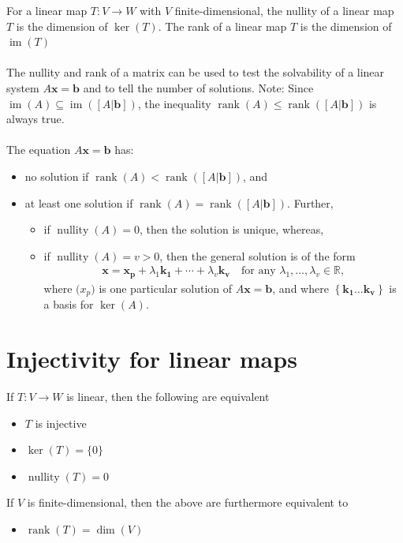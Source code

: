 \documentclass{report}
\renewcommand{\vec}{\mathbf}
\newcommand{\Dim}{\operatorname{dim}}
\newcommand{\Ker}{\operatorname{ker}}
\newcommand{\Image}{\operatorname{im}}
\newcommand{\Nullity}{\operatorname{nullity}}
\newcommand{\Rank}{\operatorname{rank}}
\begin{document}
\begin{enumerate}
	For a linear map $T: V \to W$ with $V$ finite-dimensional, the nullity of a linear map $T$ is the dimension of $\Ker(T)$. The rank of a linear map $T$ is the dimension of $\Image(T)$
	\\ \\
	The nullity and rank of a matrix can be used to test the solvability of a linear system $A\vec{x} = \vec{b}$ and to tell the number of solutions. Note: Since $\Image(A) \subseteq \Image([A|\vec{b}])$, the inequality $\Rank(A) \leq \Rank([A|\vec{b}])$ is always true.
	\\ \\
	The equation $A\vec{x} = \vec{b}$ has:
	\begin{itemize}
		\item no solution if $\Rank(A) < \Rank([A|\vec{b}])$, and
		\item at least one solution if $\Rank(A) = \Rank([A|\vec{b}])$. Further,
			\begin{itemize}
				\item if $\Nullity(A) = 0$, then the solution is unique, whereas,
				\item if $\Nullity(A) = v > 0$, then the general solution is of the form
					\begin{align*}
						\vec{x} = \vec{x_p} + \lambda_1 \vec{k_1} + \cdots + \lambda_v \vec{k_v} \quad \text{for any } \lambda_1, \dots, \lambda_v \in \mathbb{R},
					\end{align*}
					where $\vec(x_p)$ is one particular solution of $A\vec{x} = \vec{b}$, and where $\left\{\vec{k_1} \dots \vec{k_v}\right\}$ is a basis for $\Ker(A)$.
			\end{itemize}
	\end{itemize}
	
	\section{Injectivity for linear maps}

		If $T: V \to W$ is linear, then the following are equivalent
		\begin{itemize}
			\item $T$ is injective
			\item $\Ker(T) = \{0\}$
			\item $\Nullity(T) = 0$
		\end{itemize}
		If $V$ is finite-dimensional, then the above are furthermore equivalent to
		\begin{itemize}
			\item $\Rank(T) = \Dim(V)$
		\end{itemize}


\end{enumerate}
\end{document}
